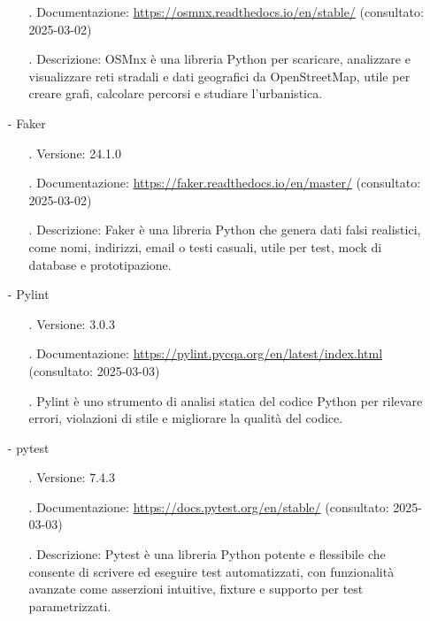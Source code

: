 \documentclass[10pt]{article}
\begin{document}
\begin{justify}
\begin{itemize}
\begin{itemize}
                            \item[.] Documentazione: \url{https://osmnx.readthedocs.io/en/stable/} (consultato: 2025-03-02)
                            \item[.] Descrizione: OSMnx è una libreria Python per scaricare, analizzare e visualizzare reti stradali e dati geografici da OpenStreetMap, 
                            utile per creare grafi, calcolare percorsi e studiare l’urbanistica.
                        \end{itemize}
                    \item[-] Faker
                        \begin{itemize}
                            \item[.] Versione: 24.1.0
                            \item[.] Documentazione: \url{https://faker.readthedocs.io/en/master/} (consultato: 2025-03-02)
                            \item[.] Descrizione: Faker è una libreria Python che genera dati falsi realistici, come nomi, indirizzi, email o testi casuali, utile per test, 
                            mock di database e prototipazione.
                        \end{itemize}
                    \item[-] Pylint
                        \begin{itemize}
                            \item[.] Versione: 3.0.3
                            \item[.] Documentazione: \url{https://pylint.pycqa.org/en/latest/index.html} (consultato: 2025-03-03)
                            \item[.] Pylint è uno strumento di analisi statica del codice Python per rilevare errori, violazioni di stile e migliorare la qualità del codice.
                        \end{itemize}
                    \item[-] pytest
                        \begin{itemize}
                            \item[.] Versione: 7.4.3
                            \item[.] Documentazione: \url{https://docs.pytest.org/en/stable/} (consultato: 2025-03-03)
                            \item[.] Descrizione: Pytest è una libreria Python potente e flessibile che consente di scrivere ed eseguire test automatizzati, con funzionalità avanzate come 
                            asserzioni intuitive, fixture e supporto per test parametrizzati.
                        \end{itemize}
                \end{itemize}


\end{justify}
\end{document}
